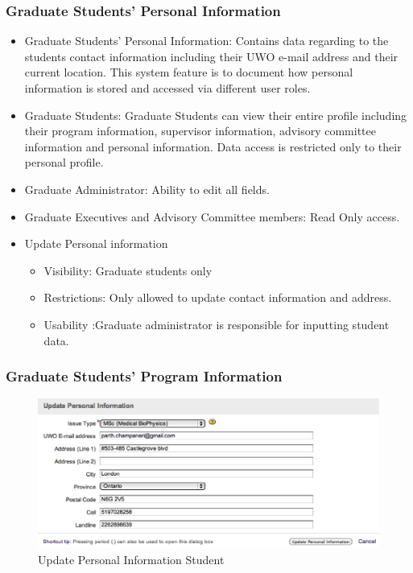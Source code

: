 \documentclass[11pt,a4paper]{report}
\begin{document}
\subsubsection{Graduate Students’ Personal Information}
\begin{itemize}
\item Graduate Students’ Personal Information:
Contains data regarding to the students contact information including their UWO e-mail address and their current location. This system feature is to document how personal information is stored and accessed via different user roles. 
\item Graduate Students: Graduate Students can view their entire profile including their program information, supervisor information, advisory committee information and personal information. Data access is restricted only to their personal profile.
\item Graduate Administrator: Ability to edit all fields.
\item Graduate Executives and Advisory Committee members: Read Only access.
\item Update Personal information
\begin{itemize}
\item Visibility: Graduate students only
\item Restrictions: Only allowed to update contact information and address. 
\item Usability :Graduate administrator is responsible for inputting student data.
\end{itemize}
\end{itemize}
\subsubsection{Graduate Students’ Program Information}

\begin{figure}[htp]
\centering
\includegraphics[scale=1]{diagrams/HTMLTemplating/UpdatePersonalInfoStudent.png}
\caption{Update Personal Information Student}
\label{fig:UpdatePIS}
\end{figure}
\end{document}
